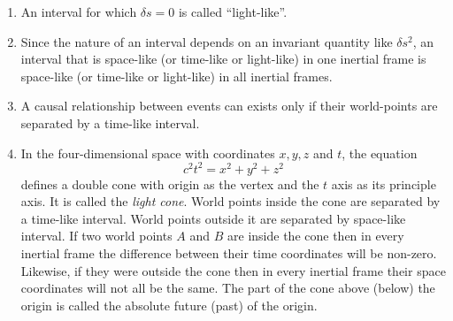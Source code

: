 \begin{enumerate}
\item An interval for which $\delta s = 0$ is called ``light-like''.

\item Since the nature of an interval depends on an invariant quantity like
$\delta s^2$, an interval that is space-like (or time-like or light-like) in one
inertial frame is space-like (or time-like or light-like) in all inertial 
frames.

\item A causal relationship between events can exists only if their world-points
are separated by a time-like interval.

\item In the four-dimensional space with coordinates $x, y, z$ and $t$, the 
equation
\begin{equation}\label{c1e6}
c^2t^2 = x^2 + y^2 + z^2
\end{equation}
defines a double cone with origin as the vertex and the $t$ axis as its 
principle axis. It is called the \emph{light cone}. 
World points inside the cone are separated by a time-like interval. World
points outside it are separated by space-like interval. If two world points $A$
and $B$ are inside the cone then in every inertial frame the difference between
their time coordinates will be non-zero. Likewise, if they were outside the cone
then in every inertial frame their space coordinates will not all be the same.
The part of the cone above (below) the origin is called the absolute future 
(past) of the origin.


\end{enumerate}

